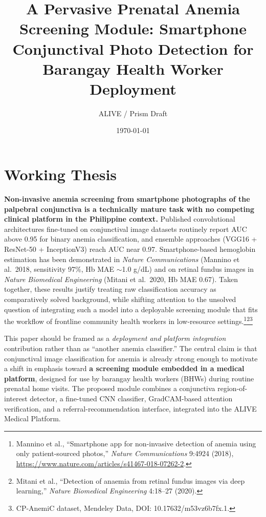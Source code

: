 \documentclass[11pt]{article}
\title{A Pervasive Prenatal Anemia Screening Module: Smartphone Conjunctival Photo Detection for Barangay Health Worker Deployment}
\author{ALIVE / Prism Draft}
\date{\today}
\begin{document}
    \maketitle

    \section{Working Thesis}

    \textbf{Non-invasive anemia screening from smartphone photographs of the palpebral conjunctiva is a technically mature task with no competing clinical platform in the Philippine context.} Published convolutional architectures fine-tuned on conjunctival image datasets routinely report AUC above 0.95 for binary anemia classification, and ensemble approaches (VGG16 + ResNet-50 + InceptionV3) reach AUC near 0.97. Smartphone-based hemoglobin estimation has been demonstrated in \emph{Nature Communications} (Mannino et al.\ 2018, sensitivity 97\%, Hb MAE $\sim$1.0 g/dL) and on retinal fundus images in \emph{Nature Biomedical Engineering} (Mitani et al.\ 2020, Hb MAE 0.67). Taken together, these results justify treating raw classification accuracy as comparatively solved background, while shifting attention to the unsolved question of integrating such a model into a deployable screening module that fits the workflow of frontline community health workers in low-resource settings.\footnote{Mannino et al., ``Smartphone app for non-invasive detection of anemia using only patient-sourced photos,'' \emph{Nature Communications} 9:4924 (2018), \url{https://www.nature.com/articles/s41467-018-07262-2}.}\footnote{Mitani et al., ``Detection of anaemia from retinal fundus images via deep learning,'' \emph{Nature Biomedical Engineering} 4:18--27 (2020).}\footnote{CP-AnemiC dataset, Mendeley Data, DOI: 10.17632/m53vz6b7fx.1.}

    This paper should be framed as a \emph{deployment and platform integration} contribution rather than as ``another anemia classifier.'' The central claim is that conjunctival image classification for anemia is already strong enough to motivate a shift in emphasis toward \textbf{a screening module embedded in a medical platform}, designed for use by barangay health workers (BHWs) during routine prenatal home visits. The proposed module combines a conjunctiva region-of-interest detector, a fine-tuned CNN classifier, GradCAM-based attention verification, and a referral-recommendation interface, integrated into the ALIVE Medical Platform.
\end{document}
